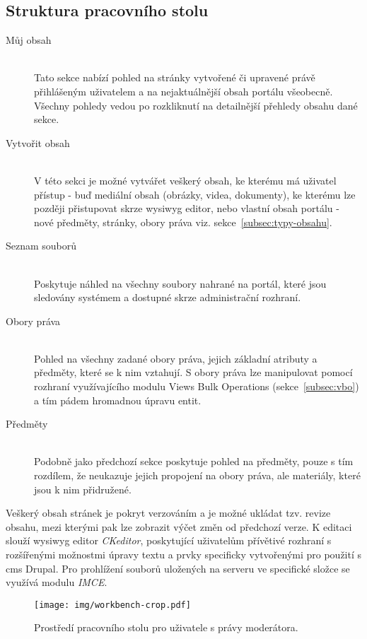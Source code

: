 \subsection*{Struktura pracovního stolu}
\begin{description}
  \item[Můj obsah] \hfill \\
  Tato sekce nabízí pohled na stránky vytvořené či upravené právě přihlášeným uživatelem a na nejaktuálnější obsah portálu všeobecně. Všechny pohledy vedou po rozkliknutí na detailnější přehledy obsahu dané sekce.  
  \item [Vytvořit obsah] \hfill \\
  V této sekci je možné vytvářet veškerý obsah, ke kterému má uživatel přístup - buď mediální obsah (obrázky, videa, dokumenty), ke kterému lze později přistupovat skrze \gls{wysiwyg} editor, nebo vlastní obsah portálu - nové předměty, stránky, obory práva viz. sekce~\ref{subsec:typy-obsahu}.
  \item [Seznam souborů] \hfill \\
  Poskytuje náhled na všechny soubory nahrané na portál, které jsou sledovány systémem a dostupné skrze administrační rozhraní.
  \item [Obory práva] \hfill \\
  Pohled na všechny zadané obory práva, jejich základní atributy a předměty, které se k nim vztahují. S obory práva lze manipulovat pomocí rozhraní využívajícího modulu Views Bulk Operations (sekce~\ref{subsec:vbo}) a tím pádem hromadnou úpravu entit.
  \item [Předměty] \hfill \\
  Podobně jako předchozí sekce poskytuje pohled na předměty, pouze s tím rozdílem, že neukazuje jejich propojení na obory práva, ale materiály, které jsou k nim přidružené.
\end{description}

Veškerý obsah stránek je pokryt verzováním a je možné ukládat tzv. revize obsahu, mezi kterými pak lze zobrazit výčet změn od předchozí verze. K editaci slouží \gls{wysiwyg} editor \emph{CKeditor}, poskytující uživatelům přívětivé rozhraní s rozšířenými možnostmi úpravy textu a prvky specificky vytvořenými pro použití s \gls{cms} Drupal. Pro prohlížení souborů uložených na serveru ve specifické složce se využívá modulu \emph{IMCE}.

\begin{figure}[htp]
  \texttt{[image: img/workbench-crop.pdf]}
  \caption{Prostředí pracovního stolu pro uživatele s právy moderátora.}
  \label{fig:workbench}
\end{figure}  

